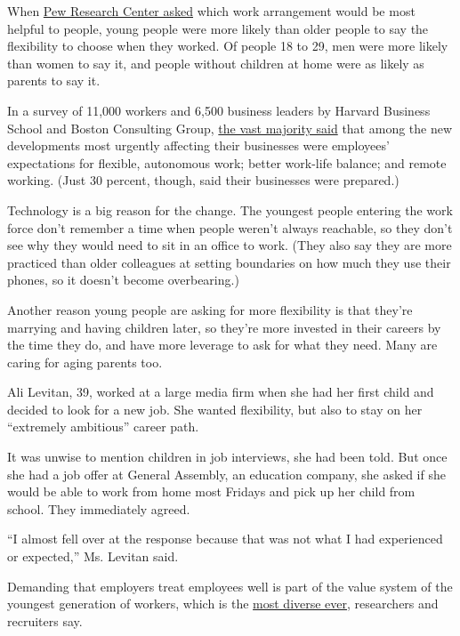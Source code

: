 When
\href{https://www.pewsocialtrends.org/2017/03/23/views-of-paid-leave-relative-to-other-workplace-benefits/}{Pew
Research Center asked} which work arrangement would be most helpful to
people, young people were more likely than older people to say the
flexibility to choose when they worked. Of people 18 to 29, men were
more likely than women to say it, and people without children at home
were as likely as parents to say it.

In a survey of 11,000 workers and 6,500 business leaders by Harvard
Business School and Boston Consulting Group,
\href{https://www.hbs.edu/managing-the-future-of-work/research/Pages/future-positive.aspx}{the
vast majority said} that among the new developments most urgently
affecting their businesses were employees' expectations for flexible,
autonomous work; better work-life balance; and remote working. (Just 30
percent, though, said their businesses were prepared.)

Technology is a big reason for the change. The youngest people entering
the work force don't remember a time when people weren't always
reachable, so they don't see why they would need to sit in an office to
work. (They also say they are more practiced than older colleagues at
setting boundaries on how much they use their phones, so it doesn't
become overbearing.)

Another reason young people are asking for more flexibility is that
they're marrying and having children later, so they're more invested in
their careers by the time they do, and have more leverage to ask for
what they need. Many are caring for aging parents too.

Ali Levitan, 39, worked at a large media firm when she had her first
child and decided to look for a new job. She wanted flexibility, but
also to stay on her ``extremely ambitious'' career path.

It was unwise to mention children in job interviews, she had been told.
But once she had a job offer at General Assembly, an education company,
she asked if she would be able to work from home most Fridays and pick
up her child from school. They immediately agreed.

``I almost fell over at the response because that was not what I had
experienced or expected,'' Ms. Levitan said.

Demanding that employers treat employees well is part of the value
system of the youngest generation of workers, which is the
\href{https://www.pewsocialtrends.org/2019/01/17/generation-z-looks-a-lot-like-millennials-on-key-social-and-political-issues/}{most
diverse ever}, researchers and recruiters say.

